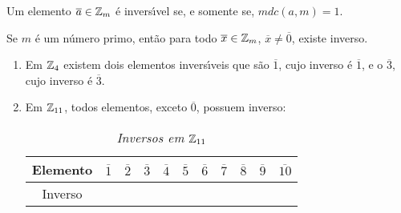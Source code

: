 \documentclass{beamer}
\begin{document}
    \begin{frame}
        \begin{proposicao}
            Um elemento $\overline{a} \in \mathbb{Z}_m$ {\'e} \pause invers{\'\i}vel \pause se, e somente se, $mdc(a,m) = 1$.\pause
        \end{proposicao}

        \begin{corolario}
            Se $m$ \'e um n\'umero primo, \pause ent\~ao para todo $\overline{x} \in \mathbb{Z}_m$, \pause $\overline{x} \ne \overline{0}$, \pause existe inverso.\pause
        \end{corolario}

        \begin{exemplos}
            \begin{enumerate}[label={\arabic*})]
                \item Em $\mathbb{Z}_4$ existem dois elementos invers{\'\i}veis \pause que s{\~a}o $\overline{1}$, \pause cujo inverso {\'e} $\overline{1}$, \pause e o $\overline{3}$, \pause cujo inverso {\'e} $\overline{3}$.\pause
                \item Em $\mathbb{Z}_{11}$, \pause todos elementos, exceto $\overline{0}$, \pause possuem inverso:
                \begin{table}[h]
                    \caption{\it Inversos em $\mathbb{Z}_{11}$}
                   \begin{tabular}{|c|c|c|c|c|c|c|c|c|c|c|} 
                        \hline
                        Elemento & $\overline{1}$ & $\overline{2}$ & $\overline{3}$ & $\overline{4}$ & $\overline{5}$ & $\overline{6}$ & $\overline{7}$ & $\overline{8}$ & $\overline{9}$ & $\overline{10}$\T \\
                        \hline
                        Inverso & \phantom{ab} & \phantom{ab} & \phantom{ab} & \phantom{ab} & \phantom{ab} & \phantom{ab} & \phantom{ab} & \phantom{ab} & \phantom{ab} & \phantom{ab} \T\\
                        \hline
                   \end{tabular}
                \end{table}
            \end{enumerate}
        \end{exemplos}
    \end{frame}
\end{document}
